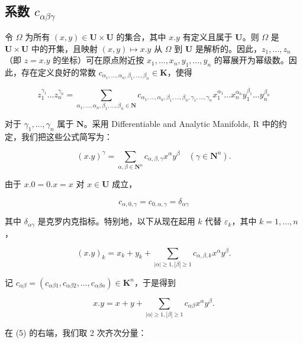 \subsection{\texorpdfstring{系数 \(c_{\alpha\beta\gamma}\)}{系数 c\_\{\textbackslash alpha\textbackslash beta\textbackslash gamma\}}}

令 \(\Omega\) 为所有 \((x,y)\in\mathbf{U}\times\mathbf{U}\) 的集合，其中 \(x.y\) 有定义且属于 \(\mathbf{U}\)。则 \(\Omega\) 是 \(\mathbf{U}\times\mathbf{U}\) 中的开集，且映射 \((x,y)\mapsto x.y\) 从 \(\Omega\) 到 \(\mathbf{U}\) 是解析的。因此，\(z_{1},\ldots,z_{n}\)（即 \(z=x.y\) 的坐标）可在原点附近按 \(x_{1},\ldots,x_{n},y_{1},\ldots,y_{n}\) 的幂展开为幂级数。因此，存在定义良好的常数 \(c_{\alpha_{1},\ldots,\alpha_{n},\beta_{1},\ldots,\beta_{n}}\in\mathbf{K}\)，使得

\[
z _ {1} ^ {\gamma_ {1}} \dots z _ {n} ^ {\gamma_ {n}} = \sum_ {\alpha_ {1},\dots,\alpha_ {n},\beta_ {1},\dots,\beta_ {n} \in \mathbf {N}} c _ {\alpha_ {1},\dots,\alpha_ {n},\beta_ {1},\dots,\beta_ {n},\gamma_ {1},\dots,\gamma_ {n}} x _ {1} ^ {\alpha_ {1}} \dots x _ {n} ^ {\alpha_ {n}} y _ {1} ^ {\beta_ {1}} \dots y _ {n} ^ {\beta_ {n}}\tag{1}
\]

对于 \(\gamma_{1},\ldots,\gamma_{n}\) 属于 \(\mathbf{N}\)。采用 Differentiable and Analytic Manifolds, R 中的约定，我们把这些公式简写为：

\[
(x. y) ^ {\gamma} = \sum_ {\alpha , \beta \in \mathbf {N} ^ {n}} c _ {\alpha , \beta , \gamma} x ^ {\alpha} y ^ {\beta} \quad (\gamma \in \mathbf {N} ^ {n}).\tag{2}
\]

由于 \(x.0 = 0.x = x\) 对 \(x\in \mathbf{U}\) 成立，

\[
c _ {\alpha , 0, \gamma} = c _ {0, \alpha , \gamma} = \delta_ {\alpha \gamma}\tag{3}
\]

其中 \(\delta_{\alpha \gamma}\) 是克罗内克指标。特别地，以下从现在起用 \(k\) 代替 \(\varepsilon_k\)，其中 \(k = 1, \ldots, n\)，

\[
(x. y) _ {k} = x _ {k} + y _ {k} + \sum_ {| \alpha | \geqslant 1, | \beta | \geqslant 1} c _ {\alpha , \beta , k} x ^ {\alpha} y ^ {\beta}.\tag{4}
\]

记 \(c_{\alpha \beta} = (c_{\alpha \beta 1}, c_{\alpha \beta 2}, \ldots, c_{\alpha \beta n}) \in \mathbf{K}^n\)，于是得到

\[
x. y = x + y + \sum_ {| \alpha | \geqslant 1, | \beta | \geqslant 1} c _ {\alpha \beta} x ^ {\alpha} y ^ {\beta}.\tag{5}
\]

在 (5) 的右端，我们取 2 次齐次分量：

